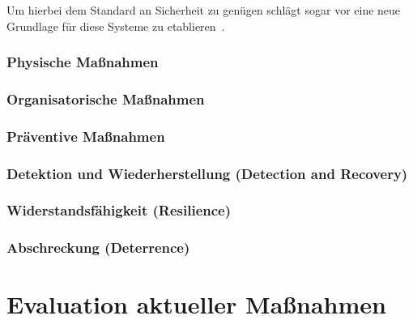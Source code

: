 \documentclass[final,bibliography=totocnumbered]{include/sikseminar}
\begin{document}
Um hierbei dem Standard an Sicherheit zu genügen schlägt \citeauthor{Lee08} sogar vor eine neue Grundlage für diese Systeme zu etablieren~\cite{Lee08}.

\subsubsection{Physische Maßnahmen}

\subsubsection{Organisatorische Maßnahmen}

\subsubsection{Präventive Maßnahmen}

\subsubsection{Detektion und Wiederherstellung (Detection and Recovery)}

\subsubsection{Widerstandsfähigkeit (Resilience)} %


\subsubsection{Abschreckung (Deterrence)} %

\section{Evaluation aktueller Maßnahmen}\label{sec:evaluation}

\newpage
\nocite{*}

\printbibliography
\newpage
\end{document}
